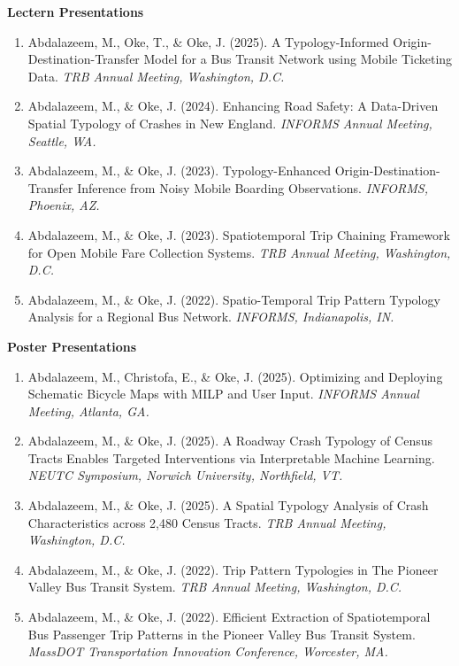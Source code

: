 \documentclass[10pt, a4paper]{article}
\newenvironment{publist}{%
  \begin{enumerate}[leftmargin=1.8em, label=\arabic*., itemsep=3pt, topsep=2pt]
}{%
  \end{enumerate}
}
\begin{document}
\textbf{Lectern Presentations}
\begin{publist}
  \item Abdalazeem, M., Oke, T., \& Oke, J. (2025). A Typology-Informed Origin-Destination-Transfer Model for a Bus Transit Network using Mobile Ticketing Data. \textit{TRB Annual Meeting, Washington, D.C.}
  \item Abdalazeem, M., \& Oke, J. (2024). Enhancing Road Safety: A Data-Driven Spatial Typology of Crashes in New England. \textit{INFORMS Annual Meeting, Seattle, WA.}
  \item Abdalazeem, M., \& Oke, J. (2023). Typology-Enhanced Origin-Destination-Transfer Inference from Noisy Mobile Boarding Observations. \textit{INFORMS, Phoenix, AZ.}
  \item Abdalazeem, M., \& Oke, J. (2023). Spatiotemporal Trip Chaining Framework for Open Mobile Fare Collection Systems. \textit{TRB Annual Meeting, Washington, D.C.}
  \item Abdalazeem, M., \& Oke, J. (2022). Spatio-Temporal Trip Pattern Typology Analysis for a Regional Bus Network. \textit{INFORMS, Indianapolis, IN.}
\end{publist}

\vspace{6pt}
\textbf{Poster Presentations}
\begin{publist}
  \item Abdalazeem, M., Christofa, E., \& Oke, J. (2025). Optimizing and Deploying Schematic Bicycle Maps with MILP and User Input. \textit{INFORMS Annual Meeting, Atlanta, GA.}
  \item Abdalazeem, M., \& Oke, J. (2025). A Roadway Crash Typology of Census Tracts Enables Targeted Interventions via Interpretable Machine Learning. \textit{NEUTC Symposium, Norwich University, Northfield, VT.}
  \item Abdalazeem, M., \& Oke, J. (2025). A Spatial Typology Analysis of Crash Characteristics across 2,480 Census Tracts. \textit{TRB Annual Meeting, Washington, D.C.}
  \item Abdalazeem, M., \& Oke, J. (2022). Trip Pattern Typologies in The Pioneer Valley Bus Transit System. \textit{TRB Annual Meeting, Washington, D.C.}
  \item Abdalazeem, M., \& Oke, J. (2022). Efficient Extraction of Spatiotemporal Bus Passenger Trip Patterns in the Pioneer Valley Bus Transit System. \textit{MassDOT Transportation Innovation Conference, Worcester, MA.}
\end{publist}
\end{document}
